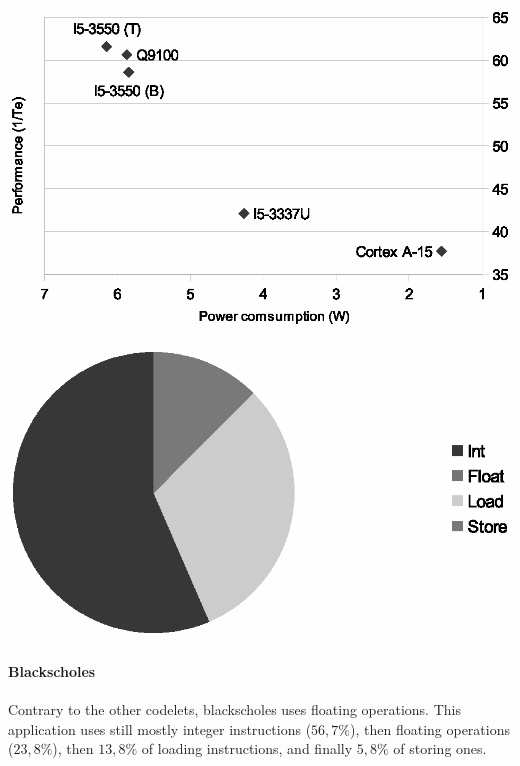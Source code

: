 \documentclass{article}
\newenvironment{Figure}
  {\par\medskip\noindent\center\minipage{0.9\linewidth}}
  {\endminipage\par\bigskip\medskip}
\begin{document}
\begin{multicols}{2}
\begin{Figure}
\centering
\includegraphics[width=\linewidth]{Freqmine.eps}
\end{Figure}

\begin{Figure}
\centering
\includegraphics[width=\linewidth]{Freqmine_instr.eps}
\end{Figure}


\paragraph{Blackscholes\\}
\label{Blackscholes}
Contrary to the other codelets, blackscholes uses floating operations. This application uses still mostly integer instructions ($56,7\%$), then floating operations ($23,8\%$), then $13,8\%$ of loading instructions, and finally $5,8\%$ of storing ones.



\end{multicols}
\end{document}
